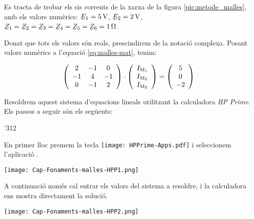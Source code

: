 \begin{exemple}\label{ex:malles}
    Es tracta de trobar els sis corrents de la xarxa de la figura \vref{pic:metode_malles}, amb els valors numèrics: $\cmplx{E}_1=\SI{5}{V}$, $\cmplx{E}_2=\SI{2}{V}$, $\cmplx{Z}_1=\cmplx{Z}_2=\cmplx{Z}_3=\cmplx{Z}_4=\cmplx{Z}_5=\cmplx{Z}_6=\SI{1}{\ohm}$.

    Donat que tots els valors són reals, prescindirem de la notació complexa. Posant valors numèrics a l'equació \eqref{eq:malles-mat}, tenim:

    \[
      \left(
        \begin{array}{ccc}
          2 & -1 &  0 \\
         -1 &  4 & -1 \\
          0 &  -1 & 2 \\
        \end{array}
      \right)
      \cdot
      \left(
          \begin{array}{c}
            I_\mathrm{M_1} \\
            I_\mathrm{M_2} \\
            I_\mathrm{M_3} \\
          \end{array}
      \right)
      =
      \left(
          \begin{array}{c}
            5 \\
            0 \\
            -2 \\
          \end{array}
      \right)
    \]

    Resoldrem aquest sistema d'equacions lineals utilitzant la calculadora \emph{HP Prime}. Els passos a seguir són els següents:

    \begin{dingautolist}{'312}
     \item En primer lloc premem la tecla \texttt{[image: HPPrime-Apps.pdf]} i seleccionem l'aplicació .

         \texttt{[image: Cap-Fonaments-malles-HPP1.png]}
    \item A continuació només cal entrar els valors del sistema a resoldre, i la calculadora ens mostra directament la solució.

         \texttt{[image: Cap-Fonaments-malles-HPP2.png]}
    \end{dingautolist}


\end{exemple}
